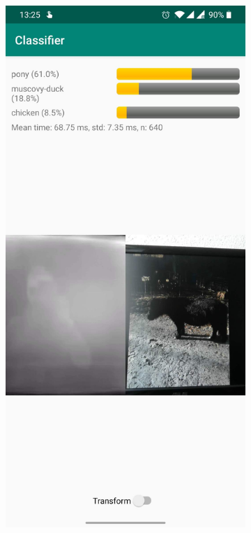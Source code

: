 \documentclass{l4proj}
\begin{document}
\begin{figure}[ht]
\begin{subfigure}[h!]{0.3\textwidth}
  \end{subfigure}
  \begin{subfigure}[h!]{0.3\textwidth}
    \includegraphics[width=\textwidth]{images/app/screenshot_1.jpg}

\end{subfigure}
\end{figure}
\end{document}
